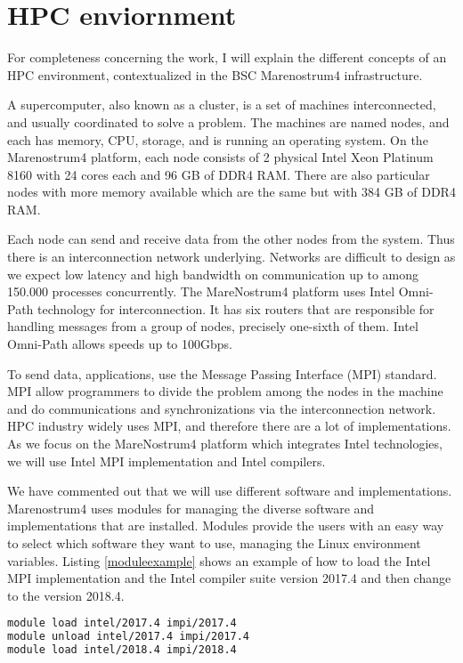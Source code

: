 \section{HPC enviornment}

For completeness concerning the work, I will explain the different concepts of an HPC environment, contextualized in the BSC Marenostrum4 infrastructure\cite{mn4userguide}.

A supercomputer, also known as a cluster, is a set of machines interconnected, and usually coordinated to solve a problem. The machines are named nodes, and each has memory, CPU, storage, and is running an operating system.  On the Marenostrum4 platform, each node consists of 2 physical Intel Xeon Platinum 8160 with 24 cores each and 96 GB of DDR4 RAM. There are also particular nodes with more memory available which are the same but with 384 GB of DDR4 RAM.
 
Each node can send and receive data from the other nodes from the system. Thus there is an interconnection network underlying. Networks are difficult to design as we expect low latency and high bandwidth on communication up to among 150.000 processes concurrently. The MareNostrum4 platform uses Intel Omni-Path technology for interconnection. It has six routers that are responsible for handling messages from a group of nodes, precisely one-sixth of them. Intel Omni-Path allows speeds up to 100Gbps.

To send data, applications, use the Message Passing Interface (MPI) standard. MPI allow programmers to divide the problem among the nodes in the machine and do communications and synchronizations via the interconnection network. HPC industry widely uses MPI, and therefore there are a lot of implementations. As we focus on the MareNostrum4 platform which integrates Intel technologies, we will use Intel MPI implementation and Intel compilers.

We have commented out that we will use different software and implementations. Marenostrum4 uses modules for managing the diverse software and implementations that are installed. Modules provide the users with an easy way to select which software they want to use, managing the Linux environment variables. Listing \ref{moduleexample} shows an example of how to load the Intel MPI implementation and the Intel compiler suite version 2017.4 and then change to the version 2018.4.

\begin{lstlisting}[language=sh, caption={Example of module usage.}, label={moduleexample}]
module load intel/2017.4 impi/2017.4
module unload intel/2017.4 impi/2017.4
module load intel/2018.4 impi/2018.4
\end{lstlisting}

